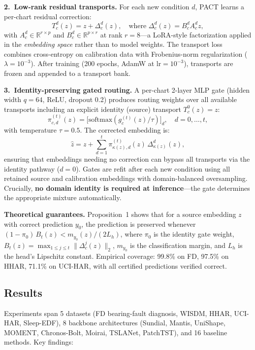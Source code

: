 \documentclass[11pt,a4paper]{article}
\begin{document}
\textbf{2.~Low-rank residual transports.} For each new condition $d$, PACT learns a per-chart residual correction:
\[
  T_c^d(z) = z + \Delta_c^d(z), \quad \text{where } \Delta_c^d(z) = B_c^d A_c^d z,
\]
with $A_c^d \in \mathbb{R}^{r \times p}$ and $B_c^d \in \mathbb{R}^{p \times r}$ at rank $r{=}8$---a LoRA-style factorization applied in the \emph{embedding space} rather than to model weights. The transport loss combines cross-entropy on calibration data with Frobenius-norm regularization ($\lambda{=}10^{-3}$). After training (200 epochs, AdamW at $\text{lr}{=}10^{-3}$), transports are frozen and appended to a transport bank.

\textbf{3.~Identity-preserving gated routing.} A per-chart 2-layer MLP gate (hidden width $q{=}64$, ReLU, dropout 0.2) produces routing weights over all available transports including an explicit identity (source) transport $T_c^0(z) = z$:
\[
  \pi_{c,d}^{(t)}(z) = \bigl[\mathrm{softmax}(g_c^{(t)}(z) / \tau)\bigr]_d, \quad d = 0, \ldots, t,
\]
with temperature $\tau{=}0.5$. The corrected embedding is:
\[
  \hat{z} = z + \sum_{d=1}^{t} \pi_{\kappa(z),d}^{(t)}(z)\, \Delta_{\kappa(z)}^d(z),
\]
ensuring that embeddings needing no correction can bypass all transports via the identity pathway ($d{=}0$). Gates are refit after each new condition using all retained source and calibration embeddings with domain-balanced oversampling. Crucially, \textbf{no domain identity is required at inference}---the gate determines the appropriate mixture automatically.

\textbf{Theoretical guarantees.} Proposition~1 shows that for a source embedding $z$ with correct prediction $y_0$, the prediction is preserved whenever $(1 - \pi_0)\, B_t(z) < m_{y_0}(z) / (2L_h)$, where $\pi_0$ is the identity gate weight, $B_t(z) = \max_{1 \leq j \leq t} \|\Delta_c^j(z)\|_2$, $m_{y_0}$ is the classification margin, and $L_h$ is the head's Lipschitz constant. Empirical coverage: 99.8\% on FD, 97.5\% on HHAR, 71.1\% on UCI-HAR, with all certified predictions verified correct.

\subsection{Results}
Experiments span 5 datasets (FD bearing-fault diagnosis, WISDM, HHAR, UCI-HAR, Sleep-EDF), 8 backbone architectures (Sundial, Mantis, UniShape, MOMENT, Chronos-Bolt, Moirai, TSLANet, PatchTST), and 16 baseline methods. Key findings:
\end{document}
